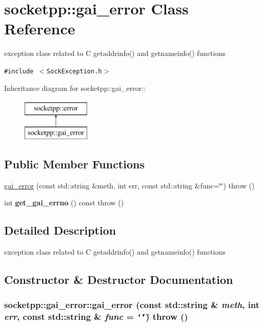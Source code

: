 \hypertarget{classsocketpp_1_1gai__error}{
\section{socketpp::gai\_\-error Class Reference}
\label{classsocketpp_1_1gai__error}
}
exception class related to C getaddrinfo() and getnameinfo() functions  


{\tt \#include $<$SockException.h$>$}

Inheritance diagram for socketpp::gai\_\-error::\begin{figure}[H]
\begin{center}
\leavevmode
\includegraphics[height=2cm]{classsocketpp_1_1gai__error}
\end{center}
\end{figure}
\subsection*{Public Member Functions}
\begin{CompactItemize}
\item 
\hyperlink{classsocketpp_1_1gai__error_fc03a724180e0edd90f7502eedb68da1}{gai\_\-error} (const std::string \&meth, int err, const std::string \&func=\char`\"{}\char`\"{})  throw ()
\item 
\hypertarget{classsocketpp_1_1gai__error_d58e15e0fab64e4d5e6ad7f33985bbb4}{
int \textbf{get\_\-gai\_\-errno} () const   throw ()}
\label{classsocketpp_1_1gai__error_d58e15e0fab64e4d5e6ad7f33985bbb4}

\end{CompactItemize}


\subsection{Detailed Description}
exception class related to C getaddrinfo() and getnameinfo() functions 

\subsection{Constructor \& Destructor Documentation}
\hypertarget{classsocketpp_1_1gai__error_fc03a724180e0edd90f7502eedb68da1}{
\subsubsection[{gai\_\-error}]{\setlength{\rightskip}{0pt plus 5cm}socketpp::gai\_\-error::gai\_\-error (const std::string \& {\em meth}, \/  int {\em err}, \/  const std::string \& {\em func} = {\tt \char`\"{}\char`\"{}})  throw ()}}
\label{classsocketpp_1_1gai__error_fc03a724180e0edd90f7502eedb68da1}


